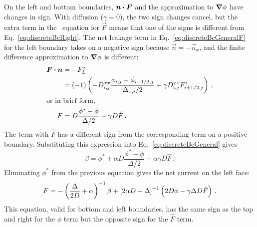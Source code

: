 On the left and bottom boundaries, $\bm{n}\bm{\cdot} \bm{F}$ and the approximation to
$\bm{\nabla} \phi$ have changes in sign. With diffusion ($\gamma=0$), the two sign
changes cancel, but the extra term in the \APone\ equation for $\vec{F}$ means
that one of the signs is different from Eq.~\eqref{eq:discreteBcRight}. The net
leakage term in Eq.~\eqref{eq:discreteBcGeneralF} for the left boundary takes on
a negative sign because $\vec{n}=- \vec{n}_x$, and the finite difference
approximation to $\bm{\nabla} \phi$ is different:
\begin{align} \nonumber
  \bm{F}\bm{\cdot} \bm{n} &= -F_L^x 
  \\
  &= (-1) \left(
  - D_{i,j}^{xx} \frac{\phi_{i,j} - \phi_{i-1/2,j}}{\Delta_{x,i} / 2}
  + \gamma D_{i,j}^{xx} F_{i+1/2,j}^{i}\right) \,,
\\ 
\intertext{or in brief form,}
\nonumber
F &= D \frac{\phi^* - \phi}{\Delta / 2} - \gamma D \hat F \,.
\end{align}
The term with $\hat F$ has a different sign from the corresponding term on a
positive boundary. Substituting this expression into
Eq.~\eqref{eq:discreteBcGeneral} gives
\begin{equation*}
  \beta = \phi^*
  + \alpha D \frac{\phi^* - \phi}{\Delta / 2} + \alpha \gamma D \hat F \,.
\end{equation*}
Eliminating $\phi^*$ from the previous equation gives the net current on the
left face:
\begin{equation*}
  F
  = -\left(  \frac{\Delta}{2 D} + \alpha\right)^{-1} \beta
  + \left[ 2 \alpha D + \Delta \right]^{-1}
  \left( 2D \phi - \gamma \Delta D \hat F \right) \,.
\end{equation*}
This equation, valid for bottom and left boundaries, has the same sign as the
top and right for the $\phi$ term but the opposite sign for the $\hat F$ term.


